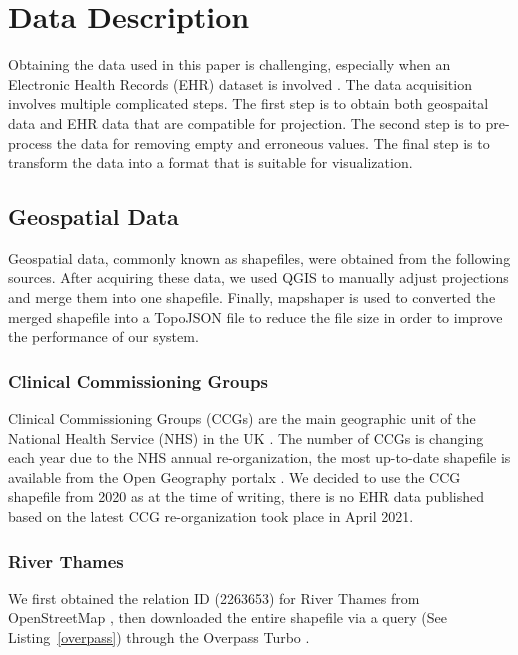 \section{Data Description}

Obtaining the data used in this paper is challenging, especially when an Electronic Health Records (EHR) dataset is involved \cite{wang2021EHRa}. The data acquisition involves multiple complicated steps. The first step is to obtain both geospaital data and EHR data that are compatible for projection. The second step is to pre-process the data for removing empty and erroneous values. The final step is to transform the data into a format that is suitable for visualization.

\subsection{Geospatial Data}

Geospatial data, commonly known as shapefiles, were obtained from the following sources. After acquiring these data, we used QGIS \cite{qgisWelcome} to manually adjust projections and merge them into one shapefile. Finally, mapshaper \cite{blochMapshaper} is used to converted the merged shapefile into a TopoJSON \cite{TopoJSON} file to reduce the file size in order to improve the performance of our system.

\subsubsection{Clinical Commissioning Groups}

Clinical Commissioning Groups (CCGs) are the main geographic unit of the National Health Service (NHS) in the UK \cite{nhsNHS}. The number of CCGs is changing each year due to the NHS annual re-organization, the most up-to-date shapefile is available from the Open Geography portalx \cite{opengeographyportalxOpen}. We decided to use the CCG shapefile from 2020 as at the time of writing, there is no EHR data published based on the latest CCG re-organization took place in April 2021.

\subsubsection{River Thames}

We first obtained the relation ID (2263653) for River Thames from OpenStreetMap \cite{openstreetmapRelation}, then downloaded the entire shapefile via a query (See Listing~\ref{overpass}) through the Overpass Turbo \cite{overpassturboOverpass}.

